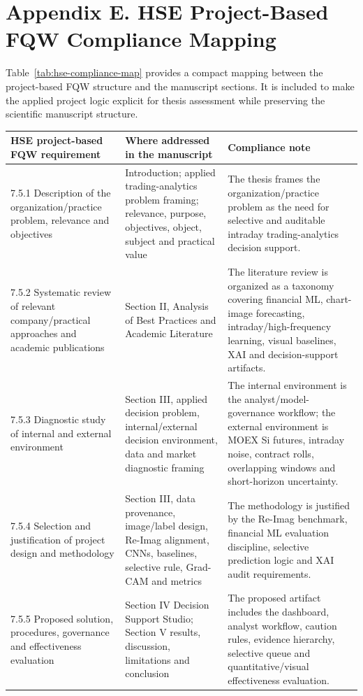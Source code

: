 \clearpage
\section*{Appendix E. HSE Project-Based FQW Compliance Mapping}

Table~\ref{tab:hse-compliance-map} provides a compact mapping between the project-based FQW structure and the manuscript sections. It is included to make the applied project logic explicit for thesis assessment while preserving the scientific manuscript structure.

\begin{center}
\label{tab:hse-compliance-map}
\scriptsize
\setlength{\tabcolsep}{3pt}
\renewcommand{\arraystretch}{1.10}
\begin{tabular}{p{}p{}p{}}
\toprule
HSE project-based FQW requirement & Where addressed in the manuscript & Compliance note \\
\midrule
7.5.1 Description of the organization/practice problem, relevance and objectives & Introduction; applied trading-analytics problem framing; relevance, purpose, objectives, object, subject and practical value & The thesis frames the organization/practice problem as the need for selective and auditable intraday trading-analytics decision support. \\
7.5.2 Systematic review of relevant company/practical approaches and academic publications & Section II, Analysis of Best Practices and Academic Literature & The literature review is organized as a taxonomy covering financial ML, chart-image forecasting, intraday/high-frequency learning, visual baselines, XAI and decision-support artifacts. \\
7.5.3 Diagnostic study of internal and external environment & Section III, applied decision problem, internal/external decision environment, data and market diagnostic framing & The internal environment is the analyst/model-governance workflow; the external environment is MOEX Si futures, intraday noise, contract rolls, overlapping windows and short-horizon uncertainty. \\
7.5.4 Selection and justification of project design and methodology & Section III, data provenance, image/label design, Re-Imag alignment, CNNs, baselines, selective rule, Grad-CAM and metrics & The methodology is justified by the Re-Imag benchmark, financial ML evaluation discipline, selective prediction logic and XAI audit requirements. \\
7.5.5 Proposed solution, procedures, governance and effectiveness evaluation & Section IV Decision Support Studio; Section V results, discussion, limitations and conclusion & The proposed artifact includes the dashboard, analyst workflow, caution rules, evidence hierarchy, selective queue and quantitative/visual effectiveness evaluation. \\
\bottomrule
\end{tabular}
\end{center}
